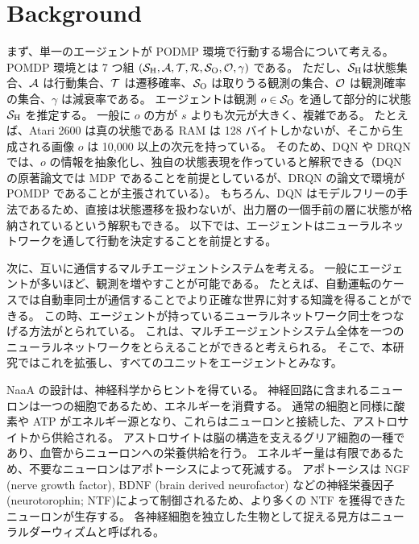 \section{Background}
まず、単一のエージェントが PODMP 環境で行動する場合について考える。
POMDP 環境とは 7 つ組 $(\S, \A, \Trans, \R, \Observations, \ObProb, \gamma)$ である。
ただし、$\S$は状態集合、$\A$ は行動集合、$\Trans$ は遷移確率、$\Observations$ は取りうる観測の集合、$\ObProb$ は観測確率の集合、$\gamma$ は減衰率である。
エージェントは観測 $o \in \Observations$ を通して部分的に状態 $\S$ を推定する。
一般に $o$ の方が $s$ よりも次元が大きく、複雑である。
たとえば、Atari 2600 は真の状態である RAM は 128 バイトしかないが、そこから生成される画像 $o$ は 10,000 以上の次元を持っている。
そのため、DQN や DRQN では、$o$ の情報を抽象化し、独自の状態表現を作っていると解釈できる（DQN の原著論文では MDP であることを前提としているが、DRQN の論文で環境が POMDP であることが主張されている）。
もちろん、DQN はモデルフリーの手法であるため、直接は状態遷移を扱わないが、出力層の一個手前の層に状態が格納されているという解釈もできる\citep{zahavy2016graying}。
以下では、エージェントはニューラルネットワークを通して行動を決定することを前提とする。

次に、互いに通信するマルチエージェントシステムを考える。
一般にエージェントが多いほど、観測を増やすことが可能である。
たとえば、自動運転のケースでは自動車同士が通信することでより正確な世界に対する知識を得ることができる。
この時、エージェントが持っているニューラルネットワーク同士をつなげる方法がとられている\citep{sukhbaatar2016learning}。
これは、マルチエージェントシステム全体を一つのニューラルネットワークをとらえることができると考えられる。
そこで、本研究ではこれを拡張し、すべてのユニットをエージェントとみなす。


NaaA の設計は、神経科学からヒントを得ている。
神経回路に含まれるニューロンは一つの細胞であるため、エネルギーを消費する。
通常の細胞と同様に酸素や ATP がエネルギー源となり、これらはニューロンと接続した、アストロサイトから供給される。
アストロサイトは脳の構造を支えるグリア細胞の一種であり、血管からニューロンへの栄養供給を行う。
エネルギー量は有限であるため、不要なニューロンはアポトーシスによって死滅する。
アポトーシスは NGF (nerve growth factor), BDNF (brain derived neurofactor) などの神経栄養因子(neurotorophin; NTF)によって制御されるため、より多くの NTF を獲得できたニューロンが生存する。
各神経細胞を独立した生物として捉える見方はニューラルダーウィズム\citep{edelman1987neural}と呼ばれる。

